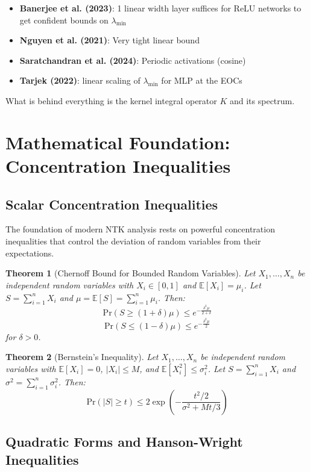 \documentclass{article}
\newtheorem{theorem}{Theorem}[section]
\newcommand{\E}{\mathbb{E}}
\newcommand{\Pr}{\text{Pr}}
\newcommand{\lambdaMin}{\lambda_{\min}}
\begin{document}
\begin{itemize}
    \item \textbf{Banerjee et al. (2023)}: 1 linear width layer suffices for ReLU networks to get confident bounds on $\lambdaMin$
    \item \textbf{Nguyen et al. (2021)}: Very tight linear bound
    \item \textbf{Saratchandran et al. (2024)}: Periodic activations (cosine)
    \item \textbf{Tarjek (2022)}: linear scaling of $\lambdaMin$ for MLP at the EOCs
\end{itemize}


What is behind everything is the kernel integral operator $K$ and its spectrum.

\newpage

\section{Mathematical Foundation: Concentration Inequalities}

\subsection{Scalar Concentration Inequalities}

The foundation of modern NTK analysis rests on powerful concentration inequalities that control the deviation of random variables from their expectations.

\begin{theorem}[Chernoff Bound for Bounded Random Variables]
Let $X_1, \ldots, X_n$ be independent random variables with $X_i \in [0,1]$ and $\E[X_i] = \mu_i$. Let $S = \sum_{i=1}^n X_i$ and $\mu = \E[S] = \sum_{i=1}^n \mu_i$. Then:
$$\Pr(S \geq (1+\delta)\mu) \leq e^{-\frac{\delta^2 \mu}{2+\delta}}$$
$$\Pr(S \leq (1-\delta)\mu) \leq e^{-\frac{\delta^2 \mu}{2}}$$
for $\delta > 0$.
\end{theorem}

\begin{theorem}[Bernstein's Inequality]
Let $X_1, \ldots, X_n$ be independent random variables with $\E[X_i] = 0$, $|X_i| \leq M$, and $\E[X_i^2] \leq \sigma_i^2$. Let $S = \sum_{i=1}^n X_i$ and $\sigma^2 = \sum_{i=1}^n \sigma_i^2$. Then:
$$\Pr(|S| \geq t) \leq 2\exp\left(-\frac{t^2/2}{\sigma^2 + Mt/3}\right)$$
\end{theorem}

\subsection{Quadratic Forms and Hanson-Wright Inequalities}
\end{document}
